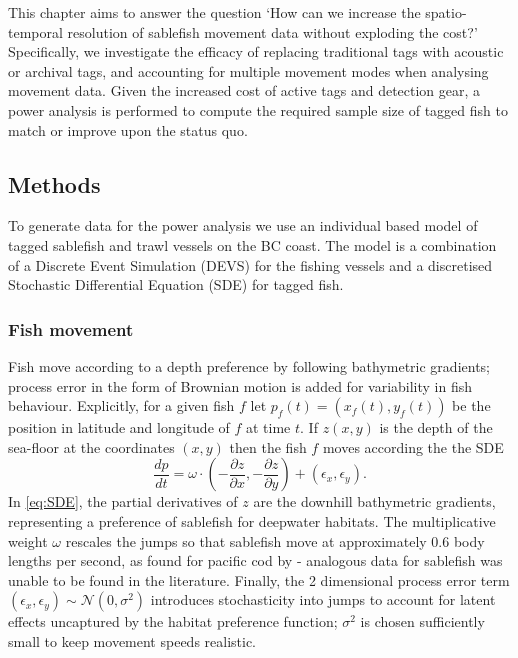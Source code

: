 \documentclass{article}
\begin{document}
This chapter aims to answer the question `How can we increase the spatio-temporal resolution of sablefish movement data without exploding the cost?' Specifically, we investigate the efficacy of replacing traditional tags with acoustic or archival tags, and accounting for multiple movement modes when analysing movement data. Given the increased cost of active tags and detection gear, a power analysis is performed to compute the required sample size of tagged fish to match or improve upon the status quo.


\subsection{Methods}

To generate data for the power analysis we use an individual based model of tagged sablefish and trawl vessels on the BC coast. The model is a combination of a Discrete Event Simulation (DEVS) for the fishing vessels and a discretised Stochastic Differential Equation (SDE) for tagged fish.

\subsubsection*{Fish movement}

Fish move according to a depth preference by following bathymetric gradients; process error in the form of Brownian motion is added for variability in fish behaviour. Explicitly, for a given fish $f$ let $p_f(t) = (x_f(t), y_f(t))$ be the position in latitude and longitude of $f$ at time $t$. If $z(x,y)$ is the depth of the sea-floor at the coordinates $(x,y)$ then the fish $f$ moves according the the SDE
\begin{equation}\label{eq:SDE}
\frac{dp}{dt} = \omega \cdot \left( - \frac{\partial z}{\partial x}, - \frac{\partial z}{\partial y} \right) + (\epsilon_x, \epsilon_y). 
\end{equation}
In \eqref{eq:SDE}, the partial derivatives of $z$ are the downhill bathymetric gradients, representing a preference of sablefish for deepwater habitats. The multiplicative weight $\omega$ rescales the jumps so that sablefish move at approximately 0.6 body lengths per second, as found for pacific cod by \citet{hanna2008temperature} - analogous data for sablefish was unable to be found in the literature. Finally, the 2 dimensional process error term $(\epsilon_x, \epsilon_y) \sim \mathcal{N}(0, \sigma^2)$ introduces stochasticity into jumps to account for latent effects uncaptured by the habitat preference function; $\sigma^2$ is chosen sufficiently small to keep movement speeds realistic.
\end{document}
